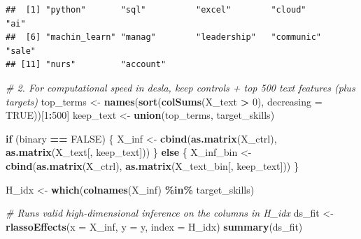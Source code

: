 \documentclass[
]{article}
\newenvironment{Shaded}{\begin{snugshade}}{\end{snugshade}}
\newcommand{\AttributeTok}[1]{\textcolor[rgb]{0.13,0.29,0.53}{#1}}
\newcommand{\CommentTok}[1]{\textcolor[rgb]{0.56,0.35,0.01}{\textit{#1}}}
\newcommand{\ConstantTok}[1]{\textcolor[rgb]{0.56,0.35,0.01}{#1}}
\newcommand{\ControlFlowTok}[1]{\textcolor[rgb]{0.13,0.29,0.53}{\textbf{#1}}}
\newcommand{\DecValTok}[1]{\textcolor[rgb]{0.00,0.00,0.81}{#1}}
\newcommand{\FunctionTok}[1]{\textcolor[rgb]{0.13,0.29,0.53}{\textbf{#1}}}
\newcommand{\NormalTok}[1]{#1}
\newcommand{\OtherTok}[1]{\textcolor[rgb]{0.56,0.35,0.01}{#1}}
\newcommand{\SpecialCharTok}[1]{\textcolor[rgb]{0.81,0.36,0.00}{\textbf{#1}}}
\begin{document}
\begin{verbatim}
##  [1] "python"       "sql"          "excel"        "cloud"        "ai"          
##  [6] "machin_learn" "manag"        "leadership"   "communic"     "sale"        
## [11] "nurs"         "account"
\end{verbatim}

\begin{Shaded}
\begin{Highlighting}[]
\CommentTok{\# 2. For computational speed in desla, keep controls + top 500 text features (plus targets)}
\NormalTok{top\_terms }\OtherTok{\textless{}{-}} \FunctionTok{names}\NormalTok{(}\FunctionTok{sort}\NormalTok{(}\FunctionTok{colSums}\NormalTok{(X\_text }\SpecialCharTok{\textgreater{}} \DecValTok{0}\NormalTok{), }\AttributeTok{decreasing =} \ConstantTok{TRUE}\NormalTok{))[}\DecValTok{1}\SpecialCharTok{:}\DecValTok{500}\NormalTok{]}
\NormalTok{keep\_text }\OtherTok{\textless{}{-}} \FunctionTok{union}\NormalTok{(top\_terms, target\_skills)}

\ControlFlowTok{if}\NormalTok{ (binary }\SpecialCharTok{==} \ConstantTok{FALSE}\NormalTok{) \{}
\NormalTok{  X\_inf }\OtherTok{\textless{}{-}} \FunctionTok{cbind}\NormalTok{(}\FunctionTok{as.matrix}\NormalTok{(X\_ctrl), }\FunctionTok{as.matrix}\NormalTok{(X\_text[, keep\_text]))}
\NormalTok{\} }\ControlFlowTok{else}\NormalTok{ \{}
\NormalTok{  X\_inf\_bin  }\OtherTok{\textless{}{-}} \FunctionTok{cbind}\NormalTok{(}\FunctionTok{as.matrix}\NormalTok{(X\_ctrl), }\FunctionTok{as.matrix}\NormalTok{(X\_text\_bin[, keep\_text]))}
\NormalTok{\}}

\NormalTok{H\_idx }\OtherTok{\textless{}{-}} \FunctionTok{which}\NormalTok{(}\FunctionTok{colnames}\NormalTok{(X\_inf) }\SpecialCharTok{\%in\%}\NormalTok{ target\_skills)}
\end{Highlighting}
\end{Shaded}

\begin{Shaded}
\begin{Highlighting}[]
\CommentTok{\# Runs valid high{-}dimensional inference on the columns in H\_idx}
\NormalTok{ds\_fit }\OtherTok{\textless{}{-}} \FunctionTok{rlassoEffects}\NormalTok{(}\AttributeTok{x =}\NormalTok{ X\_inf, }\AttributeTok{y =}\NormalTok{ y, }\AttributeTok{index =}\NormalTok{ H\_idx)}
\FunctionTok{summary}\NormalTok{(ds\_fit)}
\end{Highlighting}
\end{Shaded}
\end{document}

